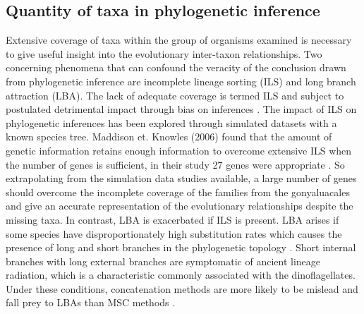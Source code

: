 \documentclass[12pt]{article}
\begin{document}
\subsection*{Quantity of taxa in phylogenetic inference}
Extensive coverage of taxa within the group of organisms examined is necessary to give useful insight into the evolutionary inter-taxon relationships.
Two concerning phenomena that can confound the veracity of the conclusion drawn from phylogenetic inference are incomplete lineage sorting (ILS) and long branch attraction (LBA). 
The lack of adequate coverage is termed ILS and subject to postulated detrimental impact through bias on inferences \cite{heath2008taxon}. 
The impact of ILS on phylogenetic inferences has been explored through simulated datasets with a known species tree. 
Maddison et. Knowles (2006) found that the amount of genetic information retains enough information to overcome extensive ILS when the number of genes is sufficient, in their study 27 genes were appropriate \cite{maddison2006inferring}. 
So extrapolating from the simulation data studies available, a large number of genes should overcome the incomplete coverage of the families from the gonyaluacales and give an accurate representation of the evolutionary relationships despite the missing taxa. 
In contrast, LBA is exacerbated if ILS is present. 
LBA arises if some species have disproportionately high substitution rates which causes the presence of long and short branches in the phylogenetic topology \cite{liu2014coalescent}. 
Short internal branches with long external branches are symptomatic of ancient lineage radiation, which is a characteristic commonly associated with the dinoflagellates. 
Under these conditions, concatenation methods are more likely to be mislead and fall prey to LBAs than MSC methods \cite{liu2014coalescent}.
\end{document}
